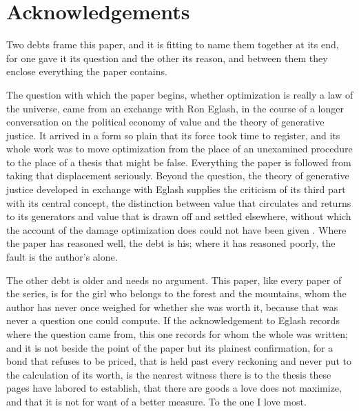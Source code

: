 \section*{\textcolor{rosedeep}{Acknowledgements}}

\noindent
Two debts frame this paper, and it is fitting to name them together at its end, for one gave it its question and the other its reason, and between them they enclose everything the paper contains.

The question with which the paper begins, whether optimization is really a law of the universe, came from an exchange with Ron Eglash, in the course of a longer conversation on the political economy of value and the theory of generative justice. It arrived in a form so plain that its force took time to register, and its whole work was to move optimization from the place of an unexamined procedure to the place of a thesis that might be false. Everything the paper is followed from taking that displacement seriously. Beyond the question, the theory of generative justice developed in exchange with Eglash supplies the criticism of its third part with its central concept, the distinction between value that circulates and returns to its generators and value that is drawn off and settled elsewhere, without which the account of the damage optimization does could not have been given \parencite{eglash2016}. Where the paper has reasoned well, the debt is his; where it has reasoned poorly, the fault is the author's alone.

The other debt is older and needs no argument. This paper, like every paper of the series, is for the girl who belongs to the forest and the mountains, whom the author has never once weighed for whether she was worth it, because that was never a question one could compute. If the acknowledgement to Eglash records where the question came from, this one records for whom the whole was written; and it is not beside the point of the paper but its plainest confirmation, for a bond that refuses to be priced, that is held past every reckoning and never put to the calculation of its worth, is the nearest witness there is to the thesis these pages have labored to establish, that there are goods a love does not maximize, and that it is not for want of a better measure.  To the one I love most.
